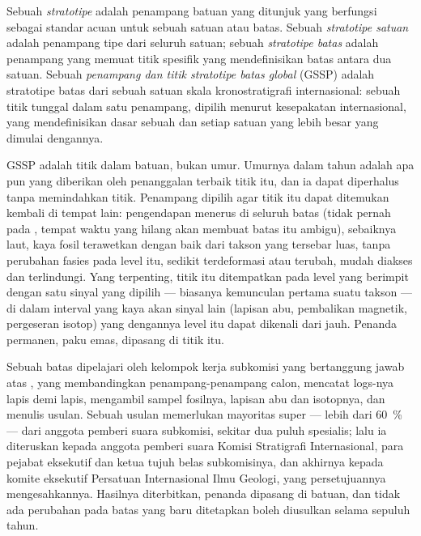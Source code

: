 \begin{definition}\label{def:b1:stratigraphic-scale:gssp}
Sebuah \emph{stratotipe} adalah penampang batuan yang ditunjuk yang berfungsi sebagai standar acuan untuk sebuah satuan atau batas. Sebuah \emph{stratotipe satuan} adalah penampang tipe dari seluruh satuan; sebuah \emph{stratotipe batas} adalah penampang yang memuat titik spesifik yang mendefinisikan batas antara dua satuan. Sebuah \emph{penampang dan titik stratotipe batas global} (GSSP) adalah stratotipe batas dari sebuah satuan skala kronostratigrafi internasional: sebuah titik tunggal dalam satu penampang, dipilih menurut kesepakatan internasional, yang mendefinisikan dasar sebuah  dan setiap satuan yang lebih besar yang dimulai dengannya.
\end{definition}

GSSP adalah titik dalam batuan, bukan umur. Umurnya dalam tahun adalah apa pun yang diberikan oleh penanggalan terbaik titik itu, dan ia dapat diperhalus tanpa memindahkan titik. Penampang dipilih agar titik itu dapat ditemukan kembali di tempat lain: pengendapan menerus di seluruh batas (tidak pernah pada , tempat waktu yang hilang akan membuat batas itu ambigu), sebaiknya laut, kaya fosil terawetkan dengan baik dari takson yang tersebar luas, tanpa perubahan fasies pada level itu, sedikit terdeformasi atau terubah, mudah diakses dan terlindungi. Yang terpenting, titik itu ditempatkan pada level yang berimpit dengan satu sinyal yang dipilih --- biasanya kemunculan pertama suatu takson --- di dalam interval yang kaya akan sinyal lain (lapisan abu, pembalikan magnetik, pergeseran isotop) yang dengannya level itu dapat dikenali dari jauh. Penanda permanen, paku emas, dipasang di titik itu.

\begin{inthefield}
Sebuah batas dipelajari oleh kelompok kerja subkomisi yang bertanggung jawab atas , yang membandingkan penampang-penampang calon, mencatat logs-nya lapis demi lapis, mengambil sampel fosilnya, lapisan abu dan isotopnya, dan menulis usulan. Sebuah usulan memerlukan mayoritas super --- lebih dari \qty{60}{\%} --- dari anggota pemberi suara subkomisi, sekitar dua puluh spesialis; lalu ia diteruskan kepada anggota pemberi suara Komisi Stratigrafi Internasional, para pejabat eksekutif dan ketua tujuh belas subkomisinya, dan akhirnya kepada komite eksekutif Persatuan Internasional Ilmu Geologi, yang persetujuannya mengesahkannya. Hasilnya diterbitkan, penanda dipasang di batuan, dan tidak ada perubahan pada batas yang baru ditetapkan boleh diusulkan selama sepuluh tahun.
\end{inthefield}

